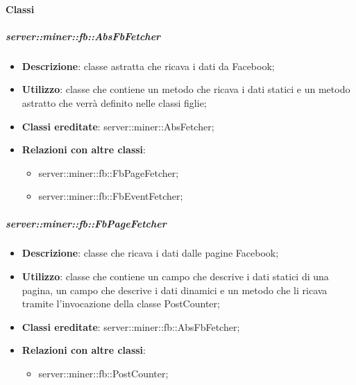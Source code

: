 	\paragraph{Classi} %
		\subparagraph{server::miner::fb::AbsFbFetcher} %
		\label{subp:server_miner_fb_AbsFbFetcher}
			\begin{itemize}
				\item \textbf{Descrizione}: classe astratta che ricava i dati da Facebook;
				\item \textbf{Utilizzo}: classe che contiene un metodo che ricava i dati statici e un metodo astratto che verrà definito nelle classi figlie;
				\item \textbf{Classi ereditate}: server::miner::AbsFetcher;				
				\item \textbf{Relazioni con altre classi}:
					\begin{itemize}
						\item server::miner::fb::FbPageFetcher;
						\item server::miner::fb::FbEventFetcher;
					\end{itemize}
			\end{itemize}
	
		\subparagraph{server::miner::fb::FbPageFetcher} %
		\label{subp:server_miner_fb_FbPageFetcher}
			\begin{itemize}
				\item \textbf{Descrizione}: classe che ricava i dati dalle pagine Facebook;
				\item \textbf{Utilizzo}: classe che contiene un campo che descrive i dati statici di una pagina, un campo che descrive i dati dinamici e un metodo che li ricava tramite l'invocazione della classe PostCounter;
				\item \textbf{Classi ereditate}: server::miner::fb::AbsFbFetcher;
				\item \textbf{Relazioni con altre classi}:
					\begin{itemize}
						\item server::miner::fb::PostCounter;
					\end{itemize}
			\end{itemize}
	
